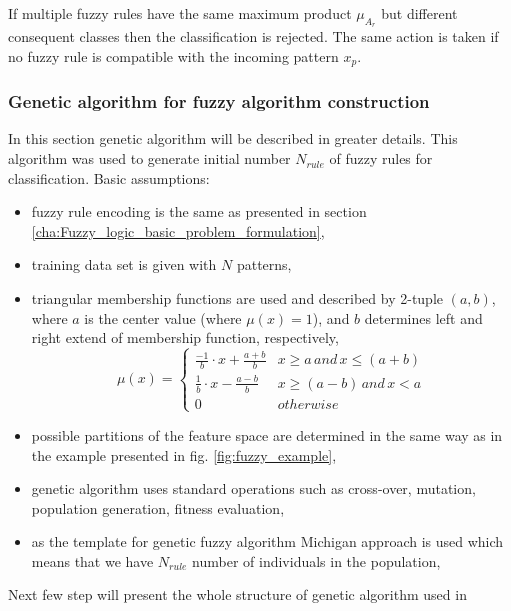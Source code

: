 If multiple fuzzy rules have the same maximum product $\mu_{A_r}$ but different
consequent classes then the classification is rejected. The same action is
taken if no fuzzy rule is compatible with the incoming pattern $x_p$.
\subsubsection{Genetic algorithm for  fuzzy algorithm construction}
\label{cha:Fuzzy_logic_genetic_algorithm}
In this section genetic algorithm will be described in greater details. This
algorithm was used to generate initial number $N_{rule}$ of fuzzy rules for
classification. 
Basic assumptions:
\begin{itemize}
    \item fuzzy rule encoding is the same as presented in section
        \ref{cha:Fuzzy_logic_basic_problem_formulation},
    \item training data set is given with $N$ patterns,
    \item triangular membership functions are used and described by 2-tuple
        $(a, b)$, where $a$ is the center value (where $\mu(x)=1$), and
        $b$ determines left and right extend of membership function,
        respectively,
        \begin{equation}
            \mu(x) = 
            \begin{cases}
                \frac{-1}{b}\cdot x + \frac{a+b}{b} &
                x \geq a \, and \, x \leq (a+b) \\
                \frac{1}{b}\cdot x - \frac{a-b}{b} &
                x \geq (a - b)\, and\, x < a \\
                0 & otherwise
            \end{cases}
            \label{eq:fuzzy_function}
        \end{equation}
    \item possible partitions of the feature space are determined in the same
        way as in the example presented in fig. \ref{fig:fuzzy_example},
    \item genetic algorithm uses standard operations such as cross-over,
        mutation, population generation, fitness evaluation,
    \item as the template for genetic fuzzy algorithm Michigan approach is
        used which means that we have $N_{rule}$ number of individuals in the
        population,
\end{itemize}
Next few step will present the whole structure of genetic algorithm used in
